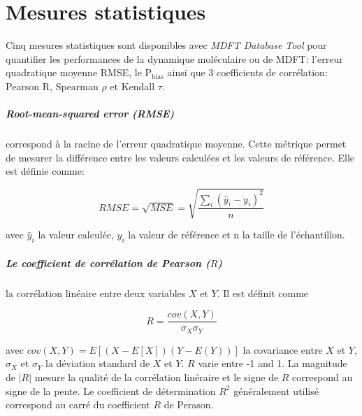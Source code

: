 %




\chapter{Mesures statistiques}
\label{chap:annexes:stats}

Cinq mesures statistiques sont disponibles avec \textit{MDFT Database Tool} pour quantifier les performances de la dynamique moléculaire ou de MDFT: l'erreur quadratique moyenne RMSE, le $\mathrm{P}_{\mathrm{bias}}$ ainsi que 3 coefficients de corrélation: Pearson R, Spearman $\rho$ et Kendall $\tau$.

\paragraph{Root-mean-squared error (RMSE)} correspond à la racine de l'erreur quadratique moyenne. Cette métrique permet de mesurer la différence entre les valeurs calculées et les valeurs de référence. Elle est définie comme:

\begin{equation}
    RMSE = \sqrt{MSE} = \sqrt{\frac{\sum_i{(\hat{y}_i-y_i)^2}}{n}}
\end{equation}

\noindent avec $\hat{y}_i$ la valeur calculée, $y_i$ la valeur de référence et n la taille de l'échantillon.

\paragraph{Le coefficient de corrélation de Pearson ($R$)} la corrélation linéaire entre deux variables $X$ et $Y$. Il est définit comme

\begin{equation}
    R = \frac{cov(X,Y)}{\sigma_X \sigma_Y}
\end{equation}

\noindent avec $cov(X,Y)=E[(X-E[X])(Y-E(Y))]$ la covariance entre $X$ et $Y$, $\sigma_X$ et $\sigma_Y$ la déviation standard de $X$ et $Y$. $R$ varie entre -1 and 1. La magnitude de $|R|$ mesure la qualité de la corrélation linéraire et le signe de $R$ correspond au signe de la pente. Le coefficient de détermination $R^2$ généralement utilisé correspond au carré du coefficient $R$ de Perason.

